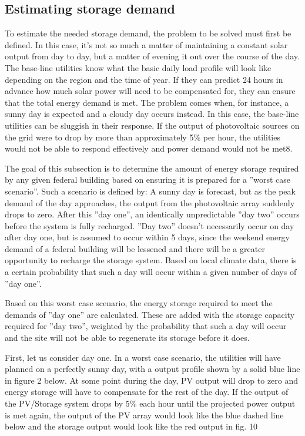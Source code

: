 \subsection{Estimating storage demand}

To estimate the needed storage demand, the problem to be solved must first be
defined. In this case, it’s not so much a matter of maintaining a constant solar 
output from day to day, but a matter of evening it out over the course of the day. 
The base-line utilities know what the basic daily load profile will look like depending 
on the region and the time of year. If they can predict 24 hours in advance how much
solar power will need to be compensated for, they can ensure that the total
energy demand is met. The problem comes when, for instance, a sunny day is
expected and a cloudy day occurs instead. In this case, the base-line utilities
can be sluggish in their response. If the output of photovoltaic sources on the
grid were to drop by more than approximately 5\% per hour, the utilities would
not be able to respond effectively and power demand would not be met\cite{patrick}{8}. 

The goal of this subsection is to determine the amount of energy storage required
by any given federal building based on ensuring it is prepared for a ''worst case
scenario''. Such a scenario is defined by:
A sunny day is forecast, but as the peak demand of the day approaches, the output
from the photovoltaic array suddenly drops to zero.
After this ''day one'', an identically unpredictable ''day two'' occurs before the 
system is fully recharged. ''Day two'' doesn't necessarily occur on day after day one,
but is assumed to occur within 5 days, since the weekend energy demand of a federal
building will be lessened and there will be a greater opportunity to recharge the 
storage system. Based on local climate data, there is a certain probability that
such a day will occur within a given number of days of ''day one''.

Based on this worst case scenario, the energy storage required to meet the demands
of ''day one'' are calculated. These are added with the storage capacity required
for ''day two'', weighted by the probability that such a day will occur and the
site will not be able to regenerate its storage before it does.


First, let us consider day one. In a worst case scenario, the utilities will have 
planned on a perfectly sunny day, with a output profile shown by a solid blue line 
in figure 2 below. At some point during the day, PV output will drop to zero and 
energy storage will have to compensate for the rest of the day. If the output of 
the PV/Storage system drops by 5\% each hour until the projected power output is met
again, the output of the PV array would look like the blue dashed line below and
the storage output would look like the red output in fig. \cite{patrick}{10}

